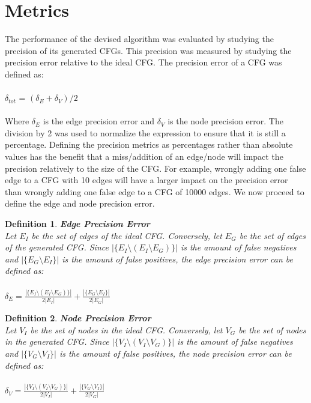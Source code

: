 \documentclass{kththesis}
\newtheorem{definition}{Definition}
\begin{document}
\section{Metrics}\label{sec:metrics}
The performance of the devised algorithm was evaluated by studying the precision of its generated CFGs. This precision was measured by studying the precision error relative to the ideal CFG. The precision error of a CFG was defined as:
\\ \\
$\delta_{tot}$ = $(\delta_E+\delta_V)/2$
\\ \\
Where $\delta_E$ is the edge precision error and $\delta_V$ is the node precision error. The division by 2 was used to normalize the expression to ensure that it is still a percentage. Defining the precision metrics as percentages rather than absolute values has the benefit that a miss/addition of an edge/node will impact the precision relatively to the size of the CFG. For example, wrongly adding one false edge to a CFG with 10 edges will have a larger impact on the precision error than wrongly adding one false edge to a CFG of 10000 edges. We now proceed to define the edge and node precision error.
\begin{definition} \textbf{Edge Precision Error}\\
Let $E_I$ be the set of edges of the ideal CFG. Conversely, let $E_G$ be the set of edges of the generated CFG. Since $|\{E_I \setminus (E_I \setminus E_G)\}|$ is the amount of false negatives and $|\{E_G \setminus E_I\}|$ is the amount of false positives, the edge precision error can be defined as:
\\ \\
$\delta_{E}=\frac{|\{E_I \setminus (E_I \setminus E_G)\}|}{2|E_I|}+\frac{|\{E_G \setminus E_I\}|}{2|E_G|}$
\end{definition}
\begin{definition}  \textbf{Node Precision Error}\\
Let $V_I$ be the set of nodes in the ideal CFG. Conversely, let $V_G$ be the set of nodes in the generated CFG. Since $|\{V_I \setminus (V_I \setminus V_G)\}|$ is the amount of false negatives and $|\{V_G \setminus V_I\}|$ is the amount of false positives, the node precision error can be defined as:
\\ \\
$\delta_{V}=\frac{|\{V_I \setminus (V_I \setminus V_G)\}|}{2|V_I|}+\frac{|\{V_G \setminus V_I\}|}{2|V_G|}$
\end{definition}
\end{document}
